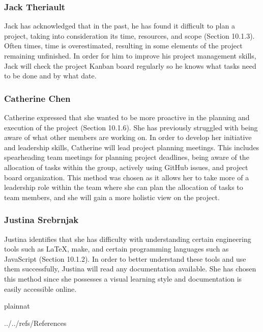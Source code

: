 \documentclass[12pt]{article}
\begin{document}
\subsubsection{Jack Theriault}
Jack has acknowledged that in the past, he has found it difficult to plan a project, taking into consideration its time, resources, and scope (Section 10.1.3). Often times, time is overestimated, resulting in some elements of the project remaining unfinished. In order for him to improve his project management skills, Jack will check the project Kanban board regularly so he knows what tasks need to be done and by what date.


\subsubsection{Catherine Chen}
Catherine expressed that she wanted to be more proactive in the planning and execution of the project (Section 10.1.6). She has previously struggled with being aware of what other members are working on. In order to develop her initiative and leadership skills, Catherine will lead project planning meetings. This includes spearheading team meetings for planning project deadlines, being aware of the allocation of tasks within the group, actively using GitHub issues, and project board organization. This method was chosen as it allows her to take more of a leadership role within the team where she can plan the allocation of tasks to team members, and she will gain a more holistic view on the project.

\subsubsection{Justina Srebrnjak}
Justina identifies that she has difficulty with understanding certain engineering tools such as \LaTeX, make, and certain programming languages such as JavaScript (Section 10.1.2). In order to better understand these tools and use them successfully, Justina will read any documentation available. She has chosen this method since she possesses a visual learning style and documentation is easily accessible online.

 {plainnat}

 {../../refs/References}
\end{document}
